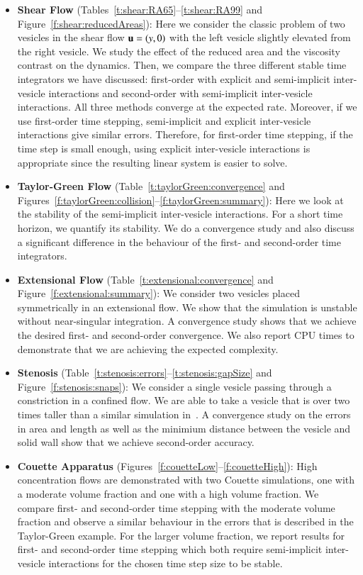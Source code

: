 \begin{itemize}
\item{\bf Shear Flow} 
(Tables~\ref{t:shear:RA65}--\ref{t:shear:RA99} and
Figure~\ref{f:shear:reducedAreas}): Here we consider the classic
problem of two vesicles in the shear flow ${\mathbf{u}} = (y,0)$ with the left
vesicle slightly elevated from the right vesicle.  We study the effect
of the reduced area and the viscosity contrast on the dynamics.  Then,
we compare the three different stable time integrators we have
discussed: first-order with explicit and semi-implicit inter-vesicle
interactions and second-order with semi-implicit inter-vesicle
interactions.  All three methods converge at the expected rate.
Moreover, if we use first-order time stepping, semi-implicit and
explicit inter-vesicle interactions give similar errors.  Therefore,
for first-order time stepping, if the time step is small enough, using
explicit inter-vesicle interactions is appropriate since the
resulting linear system is easier to solve.

\item{\bf Taylor-Green Flow}
(Table~\ref{t:taylorGreen:convergence} and
Figures~\ref{f:taylorGreen:collision}--\ref{f:taylorGreen:summary}):
Here we look at the stability of the semi-implicit inter-vesicle
interactions.  For a short time horizon, we quantify its stability.  We
do a convergence study and also discuss a significant difference in the
behaviour of the first- and second-order time integrators.

\item {\bf Extensional Flow}
(Table~\ref{t:extensional:convergence} and
Figure~\ref{f:extensional:summary}): We consider two vesicles placed
symmetrically in an extensional flow.  We show that the simulation is
unstable without near-singular integration.  A convergence study shows
that we achieve the desired first- and second-order convergence.  We
also report CPU times to demonstrate that we are achieving the expected
complexity.

\item{\bf Stenosis} 
(Table~\ref{t:stenosis:errors}--\ref{t:stenosis:gapSize} and
Figure~\ref{f:stenosis:snaps}): We consider a single vesicle passing
through a constriction in a confined flow.  We are able to take a
vesicle that is over two times taller than a similar simulation
in~\cite{rah:vee:bir}.  A convergence study on the errors in area and
length as well as the minimium distance between the vesicle and solid
wall show that we achieve second-order accuracy.

\item{\bf Couette Apparatus}
(Figures~\ref{f:couetteLow}--\ref{f:couetteHigh}): High concentration
flows are demonstrated with two Couette simulations, one with a moderate
volume fraction and one with a high volume fraction.  We compare first-
and second-order time stepping with the moderate volume fraction and
observe a similar behaviour in the errors that is described in the
Taylor-Green example.  For the larger volume fraction, we report results
for first- and second-order time stepping which both require
semi-implicit inter-vesicle interactions for the chosen time step size
to be stable.

\end{itemize}

